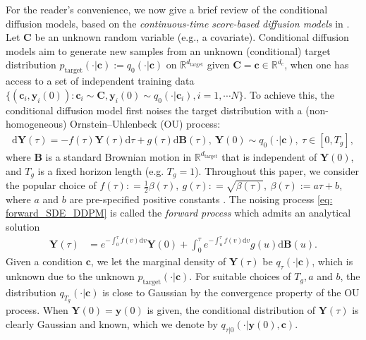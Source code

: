 \documentclass[11pt]{article}
\newcommand{\mR}{\mathbb{R}}
\newcommand{\bY}{\mathbf{Y}}
\newcommand{\by}{\mathbf{y}}
\newcommand{\bc}{\mathbf{c}}
\newcommand{\bB}{\mathbf{B}}
\newcommand{\bC}{\mathbf{C}}
\newcommand{\tar}{{\text{target}}}
\newcommand{\intd}{\mathrm{d}}
\begin{document}
For the reader's convenience, we now give a brief review of the conditional diffusion models, based on the \textit{continuous-time score-based diffusion models} in \cite{songscore}.
Let $\bC$ be an unknown random variable (e.g., a covariate). Conditional diffusion models aim to generate new samples from an unknown (conditional) target distribution $p_\tar(\cdot | \bc):= q_0(\cdot | \bc) $ on $\mR^{d_\tar}$ given $\bC = \bc \in \mR^{d_c}$,
when one has access to a set of independent training data $\{(\bc_i, \by_i(0)): \bc_i\sim\bC, \by_i(0)\sim q_0(\cdot | \bc_i), i=1,\cdots N\}$. To achieve this, the conditional diffusion model first noises the target distribution with a (non-homogeneous) Ornstein--Uhlenbeck (OU) process:
\begin{align}\label{eq: forward_SDE_DDPM}
    \intd\bY(\tau) = -f(\tau)\bY(\tau)\intd\tau + g(\tau) \intd\bB(\tau),\ \bY(0)\sim q_0(\cdot | \bc),\ \tau\in [0, T_g],
\end{align}
where $\bB$ is a standard Brownian motion in $\mR^{d_\tar}$ that is independent of $\bY(0)$, and $T_g$ is a fixed horizon length (e.g. $T_g =1$). Throughout this paper, we
consider the popular choice of $f(\tau): = \frac{1}{2}\beta(\tau),\ g(\tau): = \sqrt{\beta(\tau)},\ \beta(\tau) := a\tau + b$, where $a$ and $b$ are pre-specified positive constants \citep{ho2020denoising, songscore}. The noising process \eqref{eq: forward_SDE_DDPM} is called the \textit{forward process} which admits an analytical solution
\begin{align*}%
    \bY(\tau) &= e^{-\int_0^\tau f(v)\intd v}\bY(0) + \int_{0}^\tau e^{-\int_u^\tau f(v)\intd v}g(u) \intd \bB(u).
\end{align*}
Given a condition $\bc$, we let the marginal density of $\bY(\tau)$ be $q_\tau(\cdot | \bc)$, which is unknown due to the unknown $p_\tar(\cdot | \bc)$. For suitable choices of $T_g, a$ and $b$, the distribution $q_{T_g}(\cdot | \bc)$ is close to Gaussian by the convergence property of the OU process. When $\bY(0) = \by(0)$ is given, the conditional distribution of $\bY(\tau)$ is clearly Gaussian and known, which we denote by $q_{\tau|0}(\cdot |\by(0),  \bc)$.
\end{document}
